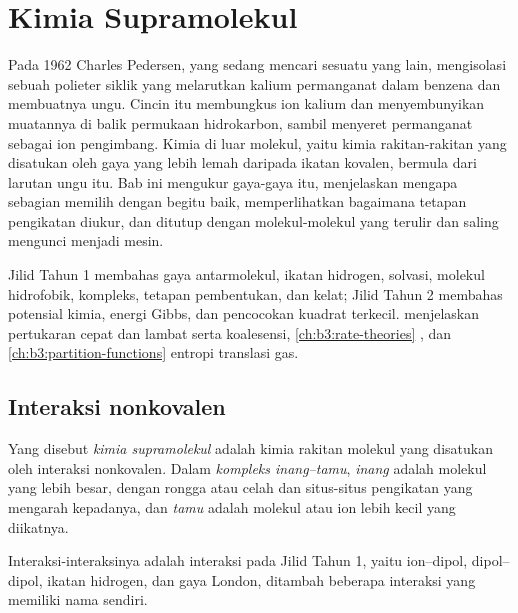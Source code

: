 \chapter{Kimia Supramolekul}\label{ch:b3:supramolecular}

Pada 1962 Charles Pedersen, yang sedang mencari sesuatu yang lain, mengisolasi sebuah
polieter siklik yang melarutkan kalium permanganat dalam benzena dan membuatnya
ungu. Cincin itu membungkus ion kalium dan menyembunyikan muatannya
di balik permukaan hidrokarbon, sambil menyeret permanganat sebagai
ion pengimbang. Kimia di luar molekul, yaitu kimia rakitan-rakitan yang disatukan
oleh gaya yang lebih lemah daripada ikatan kovalen, bermula dari larutan ungu itu.
Bab ini mengukur gaya-gaya itu, menjelaskan mengapa sebagian  memilih 
dengan begitu baik, memperlihatkan bagaimana tetapan pengikatan diukur, dan ditutup dengan molekul-molekul
yang terulir dan saling mengunci menjadi mesin.

\begin{recall}
Jilid Tahun 1 membahas gaya antarmolekul, ikatan hidrogen, solvasi,
molekul hidrofobik, kompleks, tetapan pembentukan, dan kelat; Jilid Tahun 2
membahas potensial kimia, energi Gibbs, dan pencocokan kuadrat terkecil.
 menjelaskan pertukaran cepat dan lambat serta koalesensi,
\cref{ch:b3:rate-theories} , dan
\cref{ch:b3:partition-functions} entropi translasi gas.
\end{recall}

\section{Interaksi nonkovalen}

\begin{definition}\label{def:b3:supramolecular:supramolecular}
Yang disebut \emph{kimia supramolekul} adalah kimia
rakitan molekul yang disatukan oleh interaksi nonkovalen. Dalam
\emph{kompleks inang--tamu}, \emph{inang}
adalah molekul yang lebih besar, dengan rongga atau celah dan situs-situs pengikatan yang mengarah
kepadanya, dan \emph{tamu} adalah molekul atau ion lebih kecil yang diikatnya.
\end{definition}

Interaksi-interaksinya adalah interaksi pada Jilid Tahun 1, yaitu ion--dipol, dipol--dipol,
ikatan hidrogen, dan gaya London, ditambah beberapa interaksi yang memiliki nama sendiri.

